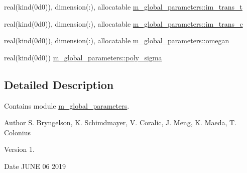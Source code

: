 \begin{Indent}
\begin{DoxyCompactItemize}
\item 
real(kind(0d0)), dimension(\+:), allocatable \hyperlink{namespacem__global__parameters_a62b213889b2dc5da7d81e7fa636231f6}{m\+\_\+global\+\_\+parameters\+::im\+\_\+trans\+\_\+t}
\item 
real(kind(0d0)), dimension(\+:), allocatable \hyperlink{namespacem__global__parameters_aa93addd83f0134aaaf319ca2b743233c}{m\+\_\+global\+\_\+parameters\+::im\+\_\+trans\+\_\+c}
\item 
real(kind(0d0)), dimension(\+:), allocatable \hyperlink{namespacem__global__parameters_ae152b49c742928bc52f6da61dd805693}{m\+\_\+global\+\_\+parameters\+::omegan}
\item 
real(kind(0d0)) \hyperlink{namespacem__global__parameters_a29164826db891e5662ce2bccdbc57d3c}{m\+\_\+global\+\_\+parameters\+::poly\+\_\+sigma}
\end{DoxyCompactItemize}
\end{Indent}


\subsection{Detailed Description}
Contains module \hyperlink{namespacem__global__parameters}{m\+\_\+global\+\_\+parameters}. 

\begin{DoxyAuthor}{Author}
S. Bryngelson, K. Schimdmayer, V. Coralic, J. Meng, K. Maeda, T. Colonius 
\end{DoxyAuthor}
\begin{DoxyVersion}{Version}
1. 
\end{DoxyVersion}
\begin{DoxyDate}{Date}
J\+U\+NE 06 2019 
\end{DoxyDate}
